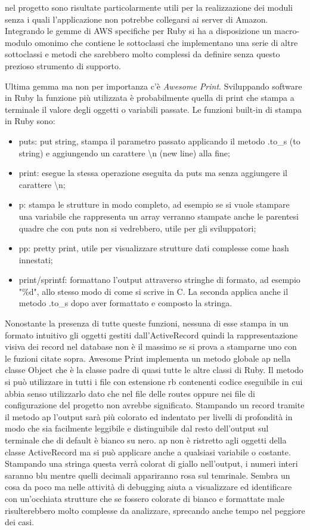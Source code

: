 \documentclass[target=bach,aauheader=,style=]{thud}
\begin{document}
nel progetto sono risultate particolarmente utili per la realizzazione dei moduli senza i quali l'applicazione non potrebbe collegarsi ai server di Amazon.
Integrando le gemme di AWS specifiche per Ruby si ha a disposizione un macro-modulo omonimo che contiene le sottoclassi che implementano una serie di altre sottoclassi e
metodi che sarebbero molto complessi da definire senza questo prezioso strumento di supporto.
\par Ultima gemma ma non per importanza c'è \textit{Awesome Print}\cite{awesome_print_gem}. Sviluppando software in Ruby la funzione più utilizzata è probabilmente quella di print che
stampa a terminale il valore degli oggetti o variabili passate. Le funzioni built-in di stampa in Ruby sono:
\begin{itemize}
    \item puts: put string, stampa il parametro passato applicando il metodo .to\_s (to string) e aggiungendo un carattere \textbackslash n (new line) alla fine;
    \item print: esegue la stessa operazione eseguita da puts ma senza aggiungere il carattere \textbackslash n;
    \item p: stampa le strutture in modo completo, ad esempio se si vuole stampare una variabile che rappresenta un array verranno stampate anche le parentesi
          quadre che con puts non si vedrebbero, utile per gli sviluppatori;
    \item pp: pretty print, utile per visualizzare strutture dati complesse come hash innestati;
    \item print/sprintf: formattano l'output attraverso stringhe di formato, ad esempio "\%d", allo stesso modo di come si scrive in C.
          La seconda applica anche il metodo .to\_s dopo aver formattato e composto la stringa.
\end{itemize}
Nonostante la presenza di tutte queste funzioni, nessuna di esse stampa in un formato intuitivo gli oggetti gestiti dall'ActiveRecord quindi la rappresentazione
visiva dei record nel database non è il massimo se si prova a stamparne uno con le fuzioni citate sopra. Awesome Print implementa un metodo globale ap nella classe Object che
è la classe padre di quasi tutte le altre classi di Ruby. Il metodo si può utilizzare in tutti i file con estensione rb contenenti codice eseguibile in cui abbia senso utilizzarlo
dato che nel file delle routes oppure nei file di configurazione del progetto non avrebbe significato.
Stampando un record tramite il metodo ap l'output sarà più colorato ed indentato per livelli di profondità in modo che sia facilmente leggibile e distinguibile dal resto
dell'output sul terminale che di default è bianco su nero. ap non è ristretto agli oggetti della classe ActiveRecord ma si può applicare anche a qualsiasi variabile o costante.
Stampando una stringa questa verrà colorat di giallo nell'output, i numeri interi saranno blu mentre quelli decimali appariranno rosa sul temrinale.
Sembra un cosa da poco ma nelle attività di debugging aiuta a visualizzare ed identificare con un'occhiata strutture che se fossero colorate di bianco e formattate male
risulterebbero molto complesse da analizzare, sprecando anche tempo nel peggiore dei casi.
\end{document}
